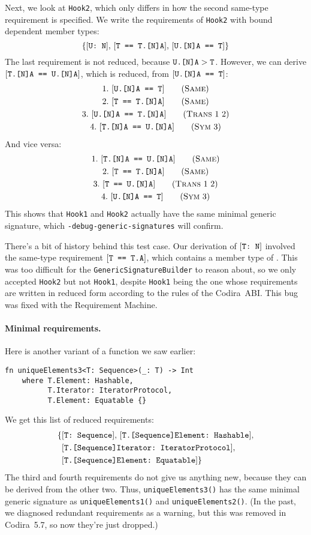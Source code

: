 \documentclass[../generics]{subfiles}
\begin{document}
Next, we look at \texttt{Hook2}, which only differs in how the second same-type requirement is specified. We write the requirements of \texttt{Hook2} with bound dependent member types:
\[\{[\texttt{U:~N}],\,[\texttt{T == T.[N]A}],\,[\texttt{U.[N]A == T}]\}\]
The last requirement is not reduced, because $\texttt{U.[N]A}>\texttt{T}$. However, we can derive $[\texttt{T.[N]A == U.[N]A}]$, which is reduced, from $[\texttt{U.[N]A == T}]$:
\begin{gather*}
\SameStep{U.[N]A}{T}{1}\\
\SameStep{T}{T.[N]A}{2}\\
\TransStep{1}{2}{U.[N]A}{T.[N]A}{3}\\
\SymStep{3}{T.[N]A}{U.[N]A}{4}
\end{gather*}
And vice versa:
\begin{gather*}
\SameStep{T.[N]A}{U.[N]A}{1}\\
\SameStep{T}{T.[N]A}{2}\\
\TransStep{1}{2}{T}{U.[N]A}{3}\\
\SymStep{3}{U.[N]A}{T}{4}
\end{gather*}
This shows that \texttt{Hook1} and \texttt{Hook2} actually have the same minimal generic signature, which \texttt{-debug-generic-signatures} will confirm.

There's a bit of history behind this test case. Our derivation of $[\texttt{T:~N}]$ involved the same-type requirement $[\texttt{T == T.A}]$, which contains a member type of \tT. This was too difficult for the \texttt{GenericSignatureBuilder} to reason about, so we only accepted \texttt{Hook2} but not \texttt{Hook1}, despite \texttt{Hook1} being the one whose requirements are written in reduced form according to the rules of the Codira~ABI. This bug was fixed with the Requirement Machine.

\paragraph{Minimal requirements.} Here is another variant of a function we saw earlier:
\begin{Verbatim}
fn uniqueElements3<T: Sequence>(_: T) -> Int
    where T.Element: Hashable,
          T.Iterator: IteratorProtocol,
          T.Element: Equatable {}
\end{Verbatim}
We get this list of reduced requirements:
\begin{align*}
\{&[\texttt{T:~Sequence}],\,[\texttt{T.[Sequence]Element:~Hashable}],\\
&[\texttt{T.[Sequence]Iterator:~IteratorProtocol}],\\
&[\texttt{T.[Sequence]Element:~Equatable}]\}
\end{align*}
The third and fourth requirements do not give us anything new, because they can be derived from the other two. Thus, \texttt{uniqueElements3()} has the same minimal generic signature as \texttt{uniqueElements1()} and \texttt{uniqueElements2()}. (In the past, we diagnosed redundant requirements as a warning, but this was removed in Codira~5.7, so now they're just dropped.)
\end{document}
